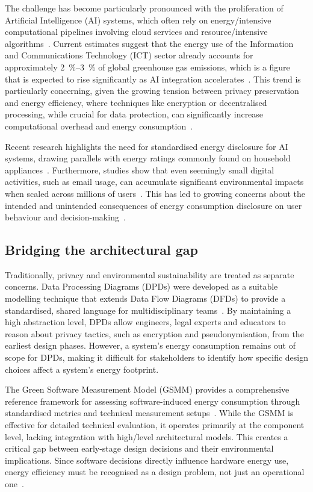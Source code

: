 \documentclass[11pt,a4paper]{article}
\begin{document}
The challenge has become particularly pronounced with the proliferation of Artificial Intelligence (AI) systems, which often rely on energy\-/intensive computational pipelines involving cloud services and resource\-/intensive algorithms~\cite{berthelot2024estimating,lannelongue2021green}.
Current estimates suggest that the energy use of the Information and Communications Technology (ICT) sector already accounts for approximately \qtyrange{2}{3}{\percent} of global greenhouse gas emissions, which is a figure that is expected to rise significantly as AI integration accelerates~\cite{guldner2024development}.
This trend is particularly concerning, given the growing tension between privacy preservation and energy efficiency, where techniques like encryption or decentralised processing, while crucial for data protection, can significantly increase computational overhead and energy consumption~\cite{bieker2025data}.

Recent research highlights the need for standardised energy disclosure for AI systems, drawing parallels with energy ratings commonly found on household appliances~\cite{luccioni2024light}.
Furthermore, studies show that even seemingly small digital activities, such as email usage, can accumulate significant environmental impacts when scaled across millions of users~\cite{siy2025elitter}.
This has led to growing concerns about the intended and unintended consequences of energy consumption disclosure on user behaviour and decision-making~\cite{klesel2026good}.

\subsection{Bridging the architectural gap}
Traditionally, privacy and environmental sustainability are treated as separate concerns.
Data Processing Diagrams (DPDs) were developed as a suitable modelling technique that extends Data Flow Diagrams (DFDs) to provide a standardised, shared language for multidisciplinary teams~\cite{bieker2025data,yourdon1979structured}.
By maintaining a high abstraction level, DPDs allow engineers, legal experts and educators to reason about privacy tactics, such as encryption and pseudonymisation, from the earliest design phases.
However, a system's energy consumption remains out of scope for DPDs, making it difficult for stakeholders to identify how specific design choices affect a system's energy footprint.

The Green Software Measurement Model (GSMM) provides a comprehensive reference framework for assessing soft\-ware-induced energy consumption through standardised metrics and technical measurement setups~\cite{guldner2024development}.
While the GSMM is effective for detailed technical evaluation, it operates primarily at the component level, lacking integration with high\-/level architectural models.
This creates a critical gap between early-stage design decisions and their environmental implications.
Since software decisions directly influence hardware energy use, energy efficiency must be recognised as a design problem, not just an operational one~\cite{hindle2012green}.
\end{document}
